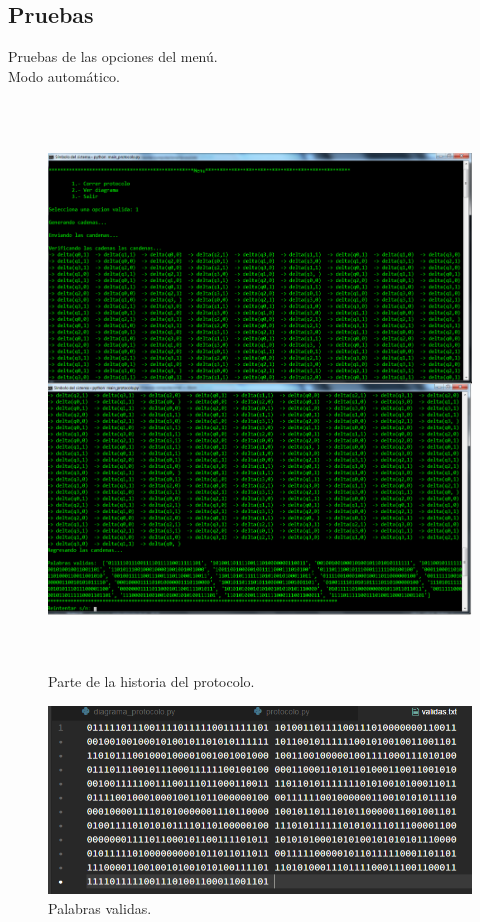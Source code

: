 	\newpage
	\subsection{Pruebas}
	Pruebas de las opciones del menú.
	\\{\large Modo automático.}
	\begin{figure}[H]
		\begin{center}
			\includegraphics[width=\linewidth, height=15cm]{img/protocolo-automata.png}
			\caption{Parte de la historia del protocolo. \cite{WEB}}
			\label{fig:protocolo1}
		\end{center}
	\end{figure}
	\begin{figure}[H]
		\begin{center}
			\includegraphics[width=\linewidth, height=5cm]{img/protocolo-salida.png}
			\caption{Palabras validas.\cite{WEB}}
			\label{fig:protocolo2}
		\end{center}
	\end{figure}
